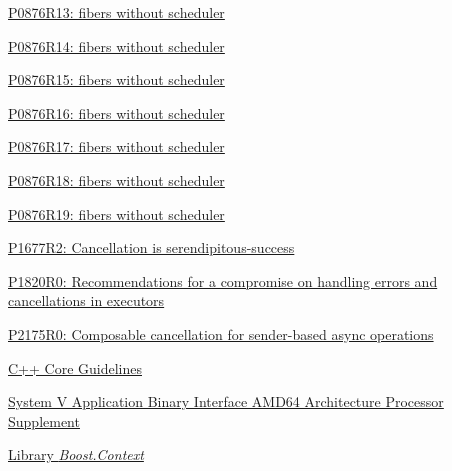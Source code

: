\begin{thebibliography}{99}
        \href{https://www.open-std.org/jtc1/sc22/wg21/docs/papers/2023/p0876r13.pdf}
        {P0876R13: fibers without scheduler}

        \href{https://www.open-std.org/jtc1/sc22/wg21/docs/papers/2023/p0876r14.pdf}
        {P0876R14: fibers without scheduler}

        \href{https://www.open-std.org/jtc1/sc22/wg21/docs/papers/2024/p0876r15.pdf}
        {P0876R15: fibers without scheduler}

        \href{https://www.open-std.org/jtc1/sc22/wg21/docs/papers/2024/p0876r16.pdf}
        {P0876R16: fibers without scheduler}

        \href{https://www.open-std.org/jtc1/sc22/wg21/docs/papers/2024/p0876r17.pdf}
        {P0876R17: fibers without scheduler}

        \href{https://www.open-std.org/jtc1/sc22/wg21/docs/papers/2024/p0876r18.pdf}
        {P0876R18: fibers without scheduler}

        \href{https://www.open-std.org/jtc1/sc22/wg21/docs/papers/2025/p0876r19.pdf}
        {P0876R19: fibers without scheduler}

        \href{https://www.open-std.org/jtc1/sc22/wg21/docs/papers/2019/p1677r2.pdf}
        {P1677R2: Cancellation is serendipitous-success}

        \href{https://www.open-std.org/jtc1/sc22/wg21/docs/papers/2019/p1820r0.html}
        {P1820R0: Recommendations for a compromise on handling errors and cancellations in executors}

        \href{https://www.open-std.org/jtc1/sc22/wg21/docs/papers/2020/p2175r0.html}
        {P2175R0: Composable cancellation for sender-based async operations}

        \href{http://isocpp.github.io/CppCoreGuidelines/CppCoreGuidelines#Ri-global}
        {C++ Core Guidelines}

        \href{http://software.intel.com/sites/default/files/article/402129/mpx-linux64-abi.pdf}
        {System V Application Binary Interface AMD64 Architecture Processor
        Supplement}

        \href{http://www.boost.org/doc/libs/release/libs/context/doc/html/index.html}
        {Library \emph{Boost.Context}}


\end{thebibliography}
